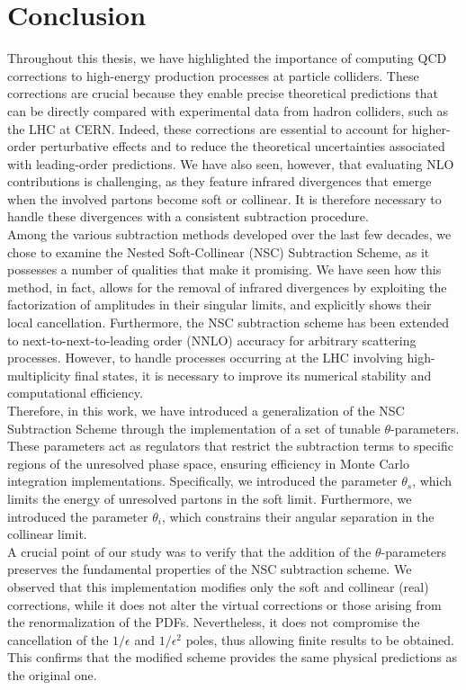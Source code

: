 \documentclass[a4paper, 12pt]{book}
\begin{document}
\clearpage

\chapter{Conclusion}

Throughout this thesis, we have highlighted the importance of computing QCD corrections to high-energy production processes at particle colliders. These corrections are crucial because they enable precise theoretical predictions that can be directly compared with experimental data from hadron colliders, such as the LHC at CERN. Indeed, these corrections are essential to account for higher-order perturbative effects and to reduce the theoretical uncertainties associated with leading-order predictions. We have also seen, however, that evaluating NLO contributions is challenging, as they feature infrared divergences that emerge when the involved partons become soft or collinear. It is therefore necessary to handle these divergences with a consistent subtraction procedure. \\
Among the various subtraction methods developed over the last few decades, we chose to examine the Nested Soft-Collinear (NSC) Subtraction Scheme, as it possesses a number of qualities that make it promising. We have seen how this method, in fact, allows for the removal of infrared divergences by exploiting the factorization of amplitudes in their singular limits, and explicitly shows their local cancellation. Furthermore, the NSC subtraction scheme has been extended to next-to-next-to-leading order (NNLO) accuracy for arbitrary scattering processes. However, to handle processes occurring at the LHC involving high-multiplicity final states, it is necessary to improve its numerical stability and computational efficiency.\\
Therefore, in this work, we have introduced a generalization of the NSC Subtraction Scheme through the implementation of a set of tunable $\theta$-parameters. These parameters act as regulators that restrict the subtraction terms to specific regions of the unresolved phase space, ensuring efficiency in Monte Carlo integration implementations. Specifically, we introduced the parameter $\theta_s$, which limits the energy of unresolved partons in the soft limit. Furthermore, we introduced the parameter $\theta_i$, which constrains their angular separation in the collinear limit.\\
A crucial point of our study was to verify that the addition of the $\theta$-parameters preserves the fundamental properties of the NSC subtraction scheme. We observed that this implementation modifies only the soft and collinear (real) corrections, while it does not alter the virtual corrections or those arising from the renormalization of the PDFs. Nevertheless, it does not compromise the cancellation of the $1/\epsilon$ and $1/\epsilon^2$ poles, thus allowing finite results to be obtained. This confirms that the modified scheme provides the same physical predictions as the original one.\\
\end{document}
